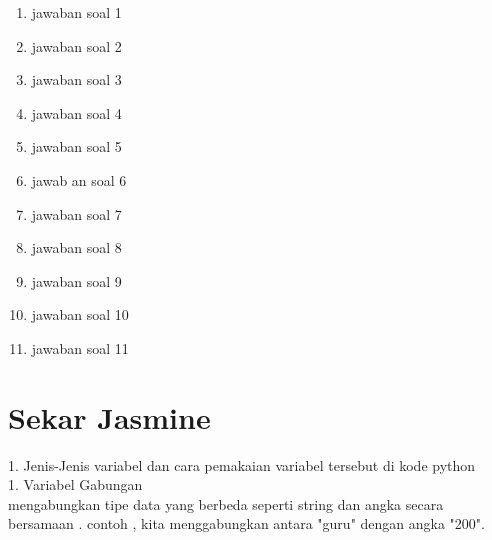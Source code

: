 \begin{enumerate}

\item jawaban soal 1


\item jawaban soal 2


\item jawaban soal 3


\item jawaban soal 4


\item jawaban soal 5


\item jawab an soal 6


\item jawaban soal 7


\item jawaban soal 8


\item jawaban soal 9


\item jawaban soal 10


\item jawaban soal 11

\end{enumerate}

\section{Sekar Jasmine}

1. Jenis-Jenis variabel dan cara pemakaian variabel tersebut di kode python\\
    1. Variabel Gabungan\\
    
    mengabungkan tipe data yang berbeda seperti string dan angka secara bersamaan . contoh , kita menggabungkan antara "guru" dengan angka "200".
    
